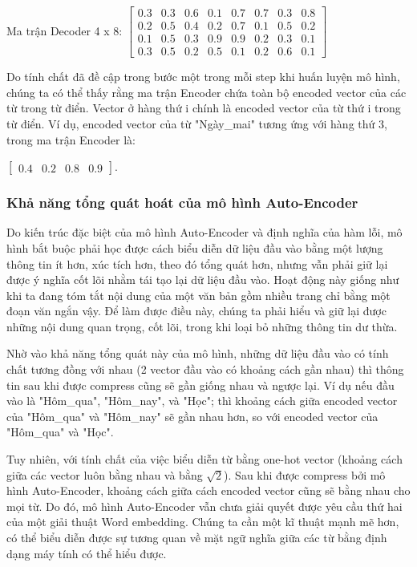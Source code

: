Ma trận Decoder 4 x 8:
$\begin{bmatrix}
 0.3 & 0.3 & 0.6 & 0.1 & 0.7 & 0.7 & 0.3 & 0.8 \\
 0.2 & 0.5 & 0.4 & 0.2 & 0.7 & 0.1 & 0.5 & 0.2 \\
 0.1 & 0.5 & 0.3 & 0.9 & 0.9 & 0.2 & 0.3 & 0.1 \\
 0.3 & 0.5 & 0.2 & 0.5 & 0.1 & 0.2 & 0.6 & 0.1
\end{bmatrix}$

Do tính chất đã đề cập trong bước một trong mỗi step khi huấn luyện mô hình, chúng ta có thể thấy rằng ma trận Encoder chứa toàn bộ encoded vector của các từ trong từ điển. Vector ở hàng thứ i chính là encoded vector của từ thứ i trong từ điển. Ví dụ, encoded vector của từ "Ngày\_mai" tương ứng với hàng thứ 3, trong ma trận Encoder là:

$\begin{bmatrix}
0.4 & 0.2 & 0.8 & 0.9
\end{bmatrix}$.

\subsubsection{Khả năng tổng quát hoát của mô hình Auto-Encoder}

Do kiến trúc đặc biệt của mô hình Auto-Encoder và định nghĩa của hàm lỗi, mô hình bắt buộc phải học được cách biểu diễn dữ liệu đầu vào bằng một lượng thông tin ít hơn, xúc tích hơn, theo đó tổng quát hơn, nhưng vẫn phải giữ lại được ý nghĩa cốt lõi nhằm tái tạo lại dữ liệu đầu vào. Hoạt động này giống như khi ta đang tóm tắt nội dung của một văn bản gồm nhiều trang chỉ bằng một đoạn văn ngắn vậy. Để làm được điều này, chúng ta phải hiểu và giữ lại được những nội dung quan trọng, cốt lõi, trong khi loại bỏ những thông tin dư thừa.

Nhờ vào khả năng tổng quát này của mô hình, những dữ liệu đầu vào có tính chất tương đồng với nhau (2 vector đầu vào có khoảng cách gần nhau) thì thông tin sau khi được compress cũng sẽ gần giống nhau và ngược lại. Ví dụ nếu đầu vào là "Hôm\_qua", "Hôm\_nay", và "Học"; thì khoảng cách giữa encoded vector của "Hôm\_qua" và "Hôm\_nay" sẽ gần nhau hơn, so với encoded vector của "Hôm\_qua" và "Học".

Tuy nhiên, với tính chất của việc biểu diễn từ bằng one-hot vector (khoảng cách giữa các vector luôn bằng nhau và bằng $\sqrt{2} $). Sau khi được compress bởi mô hình Auto-Encoder, khoảng cách giữa cách encoded vector cũng sẽ bằng nhau cho mọi từ. Do đó, mô hình Auto-Encoder vẫn chưa giải quyết được yêu cầu thứ hai của một giải thuật Word embedding. Chúng ta cần một kĩ thuật mạnh mẽ hơn, có thể biểu diễn được sự tương quan về mặt ngữ nghĩa giữa các từ bằng định dạng máy tính có thể hiểu được.

